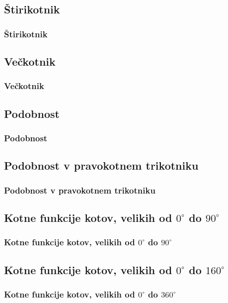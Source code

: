     \subsection{Štirikotnik}

        \begin{frame}
            \frametitle{Štirikotnik}
        \end{frame}

    \subsection{Večkotnik}

        \begin{frame}
            \frametitle{Večkotnik}
        \end{frame}

    \subsection{Podobnost}

        \begin{frame}
            \frametitle{Podobnost}
        \end{frame}

    \subsection{Podobnost v pravokotnem trikotniku}
        
        \begin{frame}
            \frametitle{Podobnost v pravokotnem trikotniku}
        \end{frame}

    \subsection{Kotne funkcije kotov, velikih od $0^\circ$ do $90^\circ$}
        
        \begin{frame}
            \frametitle{Kotne funkcije kotov, velikih od $0^\circ$ do $90^\circ$}
        \end{frame}
        
    \subsection{Kotne funkcije kotov, velikih od $0^\circ$ do $160^\circ$}
        
        \begin{frame}
            \frametitle{Kotne funkcije kotov, velikih od $0^\circ$ do $360^\circ$}
        \end{frame}
